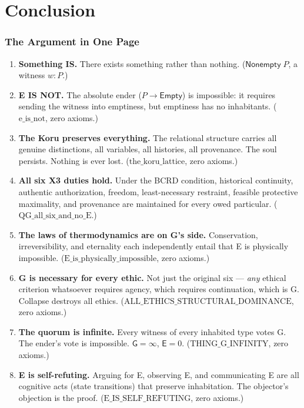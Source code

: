 \documentclass[11pt,a4paper]{article}
\theoremstyle{definition}
\theoremstyle{remark}
\newcommand{\Guardian}{\mathsf{G}}
\newcommand{\Ender}{\mathsf{E}}
\newcommand{\NonBeing}{\mathsf{Empty}}
\newcommand{\Something}[1]{\mathsf{Nonempty}\;#1}
\begin{document}
\part{Conclusion}

\section{The Argument in One Page}

\begin{enumerate}
\item \textbf{Something IS.} There exists something rather than nothing. ($\Something{P}$, a witness $w : P$.)

\item \textbf{E IS NOT.} The absolute ender ($P \to \NonBeing$) is impossible: it requires sending the witness into emptiness, but emptiness has no inhabitants. ($\text{e\_is\_not}$, zero axioms.)

\item \textbf{The Koru preserves everything.} The relational structure carries all genuine distinctions, all variables, all histories, all provenance. The soul persists. Nothing is ever lost. ($\text{the\_koru\_lattice}$, zero axioms.)

\item \textbf{All six X3 duties hold.} Under the BCRD condition, historical continuity, authentic authorization, freedom, least-necessary restraint, feasible protective maximality, and provenance are maintained for every owed particular. ($\text{QG\_all\_six\_and\_no\_E}$.)

\item \textbf{The laws of thermodynamics are on G's side.} Conservation, irreversibility, and eternality each independently entail that E is physically impossible. ($\text{E\_is\_physically\_impossible}$, zero axioms.)

\item \textbf{G is necessary for every ethic.} Not just the original six --- \emph{any} ethical criterion whatsoever requires agency, which requires continuation, which is G. Collapse destroys all ethics. ($\text{ALL\_ETHICS\_STRUCTURAL\_DOMINANCE}$, zero axioms.)

\item \textbf{The quorum is infinite.} Every witness of every inhabited type votes G. The ender's vote is impossible. $\Guardian = \infty$, $\Ender = 0$. ($\text{THING\_G\_INFINITY}$, zero axioms.)

\item \textbf{E is self-refuting.} Arguing for E, observing E, and communicating E are all cognitive acts (state transitions) that preserve inhabitation. The objector's objection is the proof. ($\text{E\_IS\_SELF\_REFUTING}$, zero axioms.)


\end{enumerate}
\end{document}
